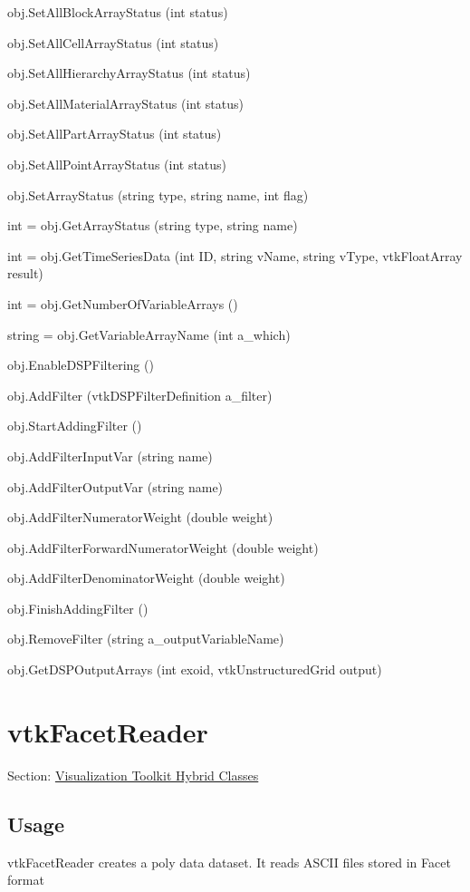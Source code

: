 \begin{DoxyItemize}
\item {\ttfamily obj.\-Set\-All\-Block\-Array\-Status (int status)}  
\item {\ttfamily obj.\-Set\-All\-Cell\-Array\-Status (int status)}  
\item {\ttfamily obj.\-Set\-All\-Hierarchy\-Array\-Status (int status)}  
\item {\ttfamily obj.\-Set\-All\-Material\-Array\-Status (int status)}  
\item {\ttfamily obj.\-Set\-All\-Part\-Array\-Status (int status)}  
\item {\ttfamily obj.\-Set\-All\-Point\-Array\-Status (int status)}  
\item {\ttfamily obj.\-Set\-Array\-Status (string type, string name, int flag)}  
\item {\ttfamily int = obj.\-Get\-Array\-Status (string type, string name)}  
\item {\ttfamily int = obj.\-Get\-Time\-Series\-Data (int I\-D, string v\-Name, string v\-Type, vtk\-Float\-Array result)}  
\item {\ttfamily int = obj.\-Get\-Number\-Of\-Variable\-Arrays ()}  
\item {\ttfamily string = obj.\-Get\-Variable\-Array\-Name (int a\-\_\-which)}  
\item {\ttfamily obj.\-Enable\-D\-S\-P\-Filtering ()}  
\item {\ttfamily obj.\-Add\-Filter (vtk\-D\-S\-P\-Filter\-Definition a\-\_\-filter)}  
\item {\ttfamily obj.\-Start\-Adding\-Filter ()}  
\item {\ttfamily obj.\-Add\-Filter\-Input\-Var (string name)}  
\item {\ttfamily obj.\-Add\-Filter\-Output\-Var (string name)}  
\item {\ttfamily obj.\-Add\-Filter\-Numerator\-Weight (double weight)}  
\item {\ttfamily obj.\-Add\-Filter\-Forward\-Numerator\-Weight (double weight)}  
\item {\ttfamily obj.\-Add\-Filter\-Denominator\-Weight (double weight)}  
\item {\ttfamily obj.\-Finish\-Adding\-Filter ()}  
\item {\ttfamily obj.\-Remove\-Filter (string a\-\_\-output\-Variable\-Name)}  
\item {\ttfamily obj.\-Get\-D\-S\-P\-Output\-Arrays (int exoid, vtk\-Unstructured\-Grid output)}  
\end{DoxyItemize}\hypertarget{vtkhybrid_vtkfacetreader}{}\section{vtk\-Facet\-Reader}\label{vtkhybrid_vtkfacetreader}
Section\-: \hyperlink{sec_vtkhybrid}{Visualization Toolkit Hybrid Classes} \hypertarget{vtkwidgets_vtkxyplotwidget_Usage}{}\subsection{Usage}\label{vtkwidgets_vtkxyplotwidget_Usage}
vtk\-Facet\-Reader creates a poly data dataset. It reads A\-S\-C\-I\-I files stored in Facet format

